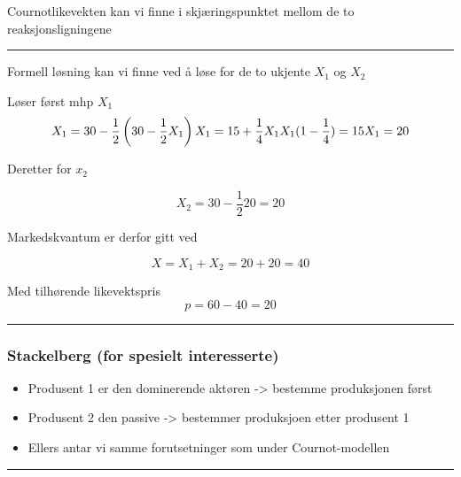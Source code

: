 \documentclass[
  letterpaper,
  DIV=11,
  numbers=noendperiod]{scrartcl}
\providecommand{\tightlist}{%
  \setlength{\itemsep}{0pt}\setlength{\parskip}{0pt}}\usepackage{longtable,booktabs,array}
\begin{document}
Cournotlikevekten kan vi finne i skjæringspunktet mellom de to
reaksjonsligningene

\begin{center}\rule{0.5\linewidth}{0.5pt}\end{center}

Formell løsning kan vi finne ved å løse for de to ukjente \(X_{1}\) og
\(X_{2}\)

Løser først mhp \(X_{1}\) \begin{equation}
X_{1} = 30 - \frac{1}{2}\left(30 - \frac{1}{2}X_{1}  \right ) \\
X_{1} = 15 + \frac{1}{4}X_{1} \\
X_{1}(1-\frac{1}{4}) = 15
X_{1} = 20
\end{equation}

Deretter for \(x_{2}\)

\begin{equation}
X_{2} = 30 - \frac{1}{2}{20}= 20  
\end{equation}

Markedskvantum er derfor gitt ved

\begin{equation}
X = X_{1}+X_{2}= 20+20 = 40
\end{equation}

Med tilhørende likevektspris \begin{equation}
p = 60-40 = 20 
\end{equation}

\begin{center}\rule{0.5\linewidth}{0.5pt}\end{center}

\subsubsection{Stackelberg (for spesielt
interesserte)}\label{stackelberg-for-spesielt-interesserte}

\begin{itemize}
\tightlist
\item
  Produsent 1 er den dominerende aktøren -\textgreater{} bestemme
  produksjonen først
\item
  Produsent 2 den passive -\textgreater{} bestemmer produksjoen etter
  produsent 1
\item
  Ellers antar vi samme forutsetninger som under Cournot-modellen
\end{itemize}

\begin{center}\rule{0.5\linewidth}{0.5pt}\end{center}
\end{document}
